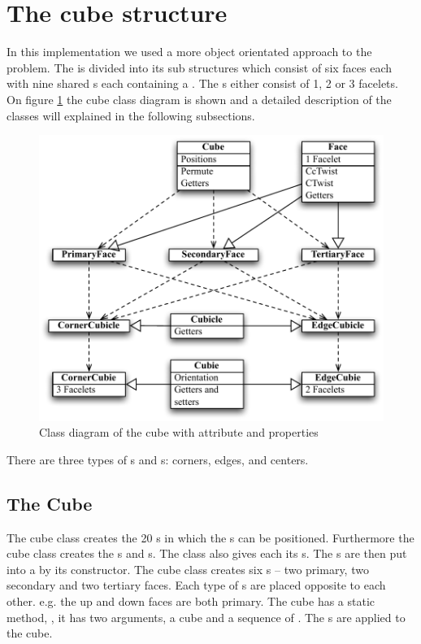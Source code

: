 \section{The cube structure}
In this implementation we used a more object orientated approach to the problem.
The \rubik{} is divided into its sub structures which consist of six faces each with nine shared \cubicle{}s each containing a \cubie{}. The \cubie{}s either consist of 1, 2 or 3 facelets. On figure \ref{fig:cubeClassDiagram} the cube class diagram is shown and a detailed description of the classes will explained in the following subsections.

\begin{figure}[htbp]
	\centering
		\includegraphics{input/pics/cubeClassDiagram.pdf}
	\caption{Class diagram of the cube with attribute and properties}
	\label{fig:cubeClassDiagram}
\end{figure}


There are three types of \cpiece{}s and \cubicle{}s: corners, edges, and centers. 

\subsection{The Cube}
The cube class creates the 20 \cubicle{}s in which the \cpiece{}s can be positioned. Furthermore the cube class creates the \face{}s and \cubie{}s. The class also gives each \cpiece{} its \facelet{}s. The \cubicle{}s are then put into a \face{} by its constructor. The cube class creates six \face{}s -- two primary, two secondary and two tertiary faces. Each type of \face{}s are placed opposite to each other. e.g. the up and down faces are both primary. The cube has a static method, , it has two arguments, a cube and a sequence of \twist{}. The \twist{}s are applied to the cube.

